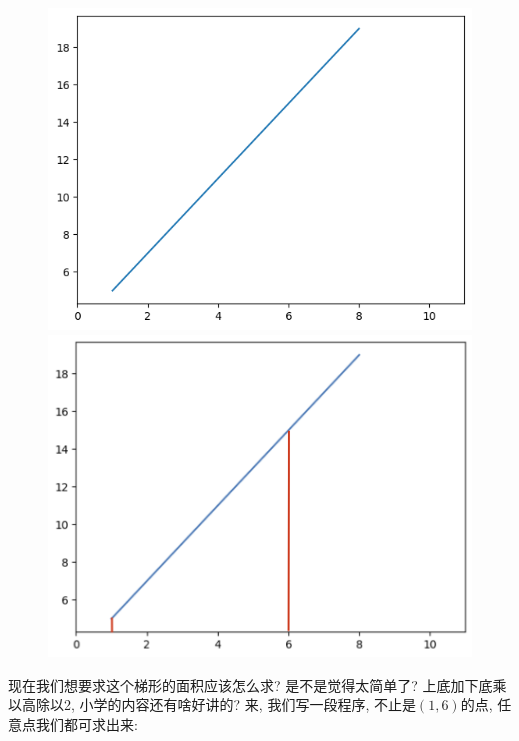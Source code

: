 \begin{figure}[ht]
  \begin{minipage}[h]{0.49\textwidth}
    \centering
    \includegraphics[width=\textwidth]{asset/20230902194132.png}
    \caption{}
    \label{fig:img13_7}
  \end{minipage} %
  \begin{minipage}[h]{0.49\textwidth}
    \centering
    \includegraphics[width=\textwidth]{asset/20230902194557.png}
    \caption{}
    \label{fig:img13_8}
  \end{minipage}
\end{figure}

现在我们想要求这个梯形的面积应该怎么求? 是不是觉得太简单了? 上底加下底乘以高除以2, 小学的内容还有啥好讲的? 来, 我们写一段程序, 不止是$(1, 6)$的点, 任意点我们都可求出来:

